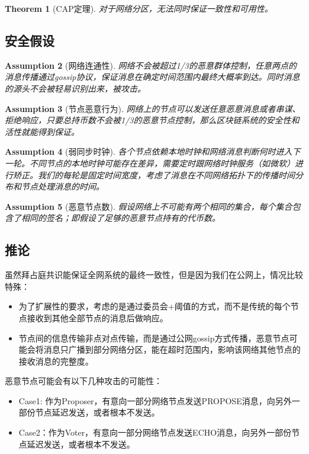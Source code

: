 \documentclass[12pt, UTF8]{article}
\newtheorem{theorem}{Theorem}[section]
\newtheorem{assumption}[theorem]{Assumption}
\begin{document}
\begin{theorem}[CAP定理]
\label{CAP}
对于网络分区，无法同时保证一致性和可用性。
\end{theorem}

\subsection{安全假设}
\begin{assumption}[网络连通性]
\label{as:Network}
网络不会被超过1/3的恶意群体控制，任意两点的消息传播通过gossip协议，保证消息在确定时间范围内最终大概率到达。同时消息的源头不会被轻易识别出来，被攻击。
\end{assumption}

\begin{assumption}[节点恶意行为]
\label{as:Mnodes}
网络上的节点可以发送任意恶意消息或者串谋、拒绝响应，只要总持币数不会被1/3的恶意节点控制，那么区块链系统的安全性和活性就能得到保证。
\end{assumption}

\begin{assumption}[弱同步时钟]
\label{as:Wclock}
各个节点依赖本地时钟和网络消息判断何时进入下一轮。不同节点的本地时钟可能存在差异，需要定时跟网络时钟服务（如微软）进行矫正。我们的每轮是固定时间宽度，考虑了消息在不同网络拓扑下的传播时间分布和节点处理消息的时间。
\end{assumption}

\begin{comment}
\begin{assumption}[身份绑定]
通过将用户的共识权利和花费代币权利进行独立和绑定，我们保证了用户身份的切换，同时支持类似dpos的方式。

\end{assumption}
\end{comment}

\begin{assumption}[恶意节点数]
假设网络上不可能有两个相同的集合，每个集合包含了相同的签名；即假设了足够的恶意节点持有的代币数。
\end{assumption}

\subsection{推论}
虽然拜占庭共识能保证全网系统的最终一致性，但是因为我们在公网上，情况比较特殊：
\begin{itemize}
\item 为了扩展性的要求，考虑的是通过委员会+阈值的方式，而不是传统的每个节点接收到其他全部节点的消息后做响应。
\item	节点间的信息传输非点对点传输，而是通过公网gossip方式传播，恶意节点可能会将消息只广播到部分网络分区，能在超时范围内，影响该网络其他节点的接收消息的完整度。
\end{itemize}
恶意节点可能会有以下几种攻击的可能性：
\begin{itemize}
\item Case1: 作为Proposer，有意向一部分网络节点发送PROPOSE消息，向另外一部份节点延迟发送，或者根本不发送。
\item Case2：作为Voter，有意向一部分网络节点发送ECHO消息，向另外一部份节点延迟发送，或者根本不发送。
\end{itemize}
\end{document}
